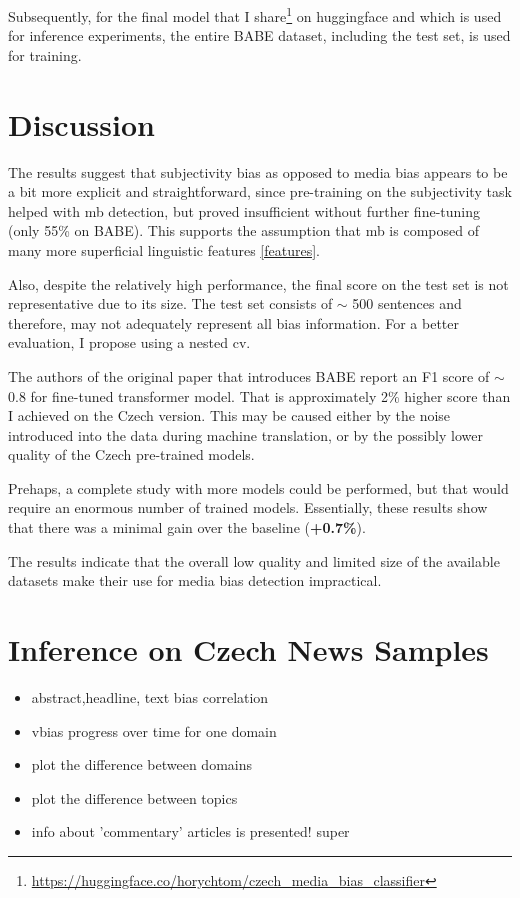 Subsequently, for the final model that I share\footnote{\url{https://huggingface.co/horychtom/czech_media_bias_classifier}} on huggingface and which is used for inference experiments, the entire BABE dataset, including the test set, is used for training.

\section{Discussion}
The results suggest that subjectivity bias as opposed to media bias appears to be a bit more explicit and straightforward, since pre-training on the subjectivity task helped with \gls{mb} detection, but proved insufficient without further fine-tuning (only 55\% on BABE). This supports the assumption that \gls{mb} is composed of many more superficial linguistic features \ref{features}.

Also, despite the relatively high performance, the final score on the test set is not representative due to its size. The test set consists of $\sim$ 500 sentences and therefore, may not adequately represent all bias information. For a better evaluation, I propose using a nested \gls{cv}.

The authors of the original paper that introduces BABE \cite{spinde2021neural} report an F1 score of $\sim$ 0.8 for fine-tuned transformer model. That is approximately 2\% higher score than I achieved on the Czech version. This may be caused either by the noise introduced into the data during machine translation, or by the possibly lower quality of the Czech pre-trained models.

Prehaps, a complete study with more models could be performed, but that would require an enormous number of trained models. Essentially, these results show that there was a minimal gain over the baseline (\textbf{+0.7\%}).

The results indicate that the overall low quality and limited size of the available datasets make their use for media bias detection impractical.







\newpage

\section{Inference on Czech News Samples}\label{inference}

\begin{itemize}
    \item abstract,headline, text bias correlation
    \item vbias progress over time for one domain
    \item plot the difference between domains
    \item plot the difference between topics
    \item info about 'commentary' articles is presented! super
\end{itemize}

